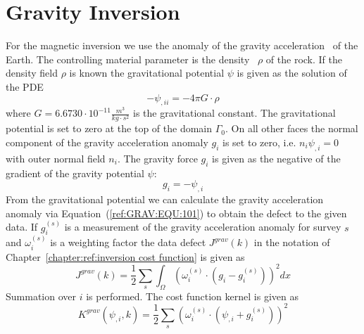 
%
%
%

\section{Gravity Inversion}\label{sec:forward gravity}
For the magnetic inversion we use the anomaly of the gravity acceleration~ of the Earth.
The controlling material parameter is the density~ $\rho$ of
the rock.
If the density field $\rho$ is known the gravitational potential $\psi$ is
given as the solution of the PDE
\begin{equation}\label{ref:GRAV:EQU:100}
-\psi_{,ii} = -4\pi G \cdot  \rho
\end{equation}
where $G=6.6730 \cdot 10^{-11}  \frac{m^3}{kg \cdot s^2}$ is the gravitational
constant.
The gravitational potential is set to zero at the top of the
domain $\Gamma_0$.
On all other faces the normal component of the gravity acceleration anomaly
$g_i$ is set to zero, i.e. $n_i \psi_{,i} = 0$ with outer normal field $n_i$.
The gravity force $g_i$ is given as the negative of the gradient of the gravity
potential $\psi$:
\begin{equation}\label{ref:GRAV:EQU:101}
 g_i = - \psi_{,i} 
\end{equation} 
From the gravitational potential we can calculate the gravity acceleration
anomaly via Equation~(\ref{ref:GRAV:EQU:101}) to obtain the defect to the
given data.
If $g^{(s)}_i$ is a measurement of the gravity acceleration anomaly for
survey $s$ and $\omega^{(s)}_i$ is a weighting factor the data defect
$J^{grav}(k)$ in the notation of Chapter~\ref{chapter:ref:inversion cost function} is given as
\begin{equation}\label{ref:GRAV:EQU:9}
J^{grav}(k) = \frac{1}{2}\sum_{s} \int_{\Omega} ( \omega^{(s)}_i \cdot (g_{i}- g^{(s)}_i) ) ^2 dx
\end{equation} 
Summation over $i$ is performed. 
The cost function kernel is given as
\begin{equation}\label{ref:GRAV:EQU:10}
K^{grav}(\psi_{,i},k) = \frac{1}{2}\sum_{s} ( \omega^{(s)}_i \cdot (\psi_{,i}+ g^{(s)}_i) ) ^2
\end{equation} 
